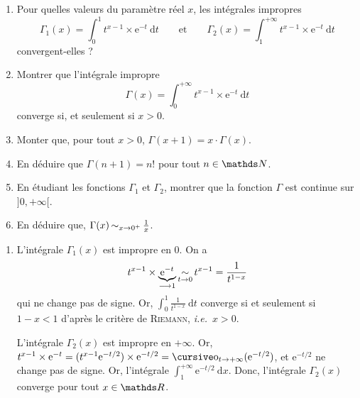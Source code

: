 \begin{exo}
	\begingroup\slshape
	\begin{enumerate}
		\item Pour quelles valeurs du paramètre réel $x$, les intégrales impropres \[
				\Gamma_1(x) = \int_{0}^{1} t^{x - 1} \times \mathrm{e}^{-t}~\mathrm{d}t\qquad \text{et}\qquad \Gamma_2(x) = \int_{1}^{+\infty} t^{x-1} \times \mathrm{e}^{-t}~\mathrm{d}t
			\] convergent-elles ?
		\item Montrer que l'intégrale impropre \[
				\Gamma(x) = \int_{0}^{+\infty} t^{x-1}\times \mathrm{e}^{-t}~\mathrm{d}t
			\] converge si, et seulement si $x > 0$.
		\item Monter que, pour tout $x > 0$, $\Gamma(x + 1) = x \cdot \Gamma(x)$.
		\item En déduire que $\Gamma(n+1) = n!$\/ pour tout $n \in \N$.
		\item En étudiant les fonctions $\Gamma_1$\/ et $\Gamma_2$, montrer que la fonction $\Gamma$\/ est continue sur $]0,+\infty[$.
		\item En déduire que, $\Gamma(x) \operatorname*{\sim}_{x\to 0^+} \frac{1}{x}$.
	\end{enumerate}
	\endgroup

	\begin{enumerate}
		\item L'intégrale $\Gamma_1(x)$\/ est impropre en 0. On a \[
				t^{x-1} \times \underbrace{\mathrm{e}^{-t}}_{\mathclap{\longrightarrow 1}} \simi_{t\to 0} t^{x-1} = \frac{1}{t^{1-x}}
			\] qui ne change pas de signe. Or, $\int_{0}^{1} \frac{1}{t^{1-x}}~\mathrm{d}t$\/ converge si et seulement si $1-x < 1$\/ d'après le critère de \textsc{Riemann}, \textit{i.e.}\ $x > 0$.

			L'intégrale $\Gamma_2(x)$\/ est impropre en $+\infty$. Or, $t^{x-1} \times \mathrm{e}^{-t} = (t^{x-1} \mathrm{e}^{-t / 2}) \times \mathrm{e}^{-t / 2} = \po_{t\to +\infty}(\mathrm{e}^{-t / 2})$, et $\mathrm{e}^{-t / 2}$\/ ne change pas de signe. Or, l'intégrale $\int_{1}^{+\infty}  \mathrm{e}^{-t / 2}~\mathrm{d}x$. Donc, l'intégrale $\Gamma_2(x)$\/ converge pour tout $x \in \R$.


\end{enumerate}
\end{exo}
